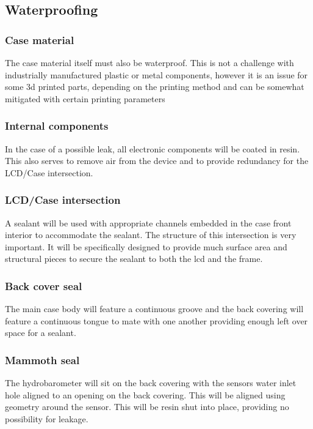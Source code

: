 \documentclass{article}
\begin{document}
\subsection{Waterproofing}

\subsubsection{Case material}
The case material itself must also be waterproof. This is not a challenge with industrially manufactured plastic or metal components, however it is an issue for some 3d printed parts, depending on the printing method and can be somewhat mitigated with certain printing parameters

\subsubsection{Internal components}
In the case of a possible leak, all electronic components will be coated in resin. This also serves to remove air from the device and to provide redundancy for the LCD/Case intersection.

\subsubsection{LCD/Case intersection}
A sealant will be used with appropriate channels embedded in the case front interior to accommodate the sealant. The structure of this intersection is very important. It will be specifically designed to provide much surface area and structural pieces to secure the sealant to both the lcd and the frame.

\subsubsection{Back cover seal}
The main case body will feature a continuous groove and the back covering will feature a continuous tongue to mate with one another providing enough left over space for a sealant.

\subsubsection{Mammoth seal}
The hydrobarometer will sit on the back covering with the sensors water inlet hole aligned to an opening on the back covering. This will be aligned using geometry around the sensor. This will be resin shut into place, providing no possibility for leakage. 
\end{document}

